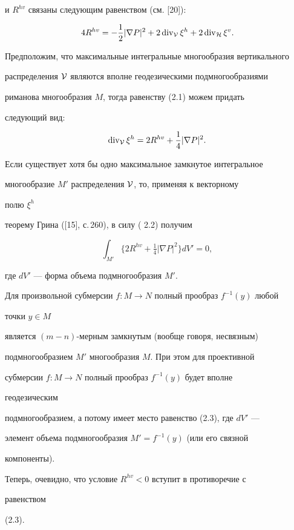 \begin{pf}
и $R^{hv}$ связаны следующим равенством (см. [20]): 


\begin{equation} 


4R^{hv}=-\frac{1}{2}|\nabla P|^2+2\Div_{\cal V}\xi^h+ 


2\Div_{\cal H}\xi^v. 


\end{equation} 


 


Предположим, что максимальные интегральные многообразия вертикального 


распределения $\cal V$ являются вполне геодезическими подмногообразиями 


риманова многообразия $M$, тогда равенству (2.1) можем придать 


следующий вид: 


\begin{equation} 


\Div_{\cal V}\xi^h=2R^{hv}+\frac{1}{4}|\nabla P|^2. 


\end{equation} 


Если существует хотя бы одно максимальное замкнутое интегральное 


многообразие $M'$ распределения $\cal V$, то, применяя к векторному 


полю $\xi^h$ 


теорему Грина ([15], с.\,260), в силу ( 2.2) получим 


\begin{equation} 


\int_{M'}\{2R^{hv}+\tfrac{1}{4}|\nabla P|^2\}d V'=0, 


\end{equation} 


где $d V'$ --- форма объема подмногообразия $M'$. 


 


Для произвольной субмерсии $f:M\to N$ полный прообраз $f^{-1}(y)$ любой 


точки $y\in M$ 


является $(m-n)$-мерным замкнутым (вообще говоря, несвязным) 


подмногообразием $M'$ многообразия $M$. При этом для проективной 


субмерсии $f:M\to N$ полный прообраз $f^{-1}(y)$ будет вполне 


геодезическим 


подмногообразием, а потому имеет место равенство (2.3), где $d V'$ --- 


элемент объема подмногообразия $M'=f^{-1}(y)$ (или его связной 


компоненты). 


Теперь, очевидно, что условие $R^{hv}<0$ вступит в противоречие с 


равенством 


(2.3). 


\end{pf} 


